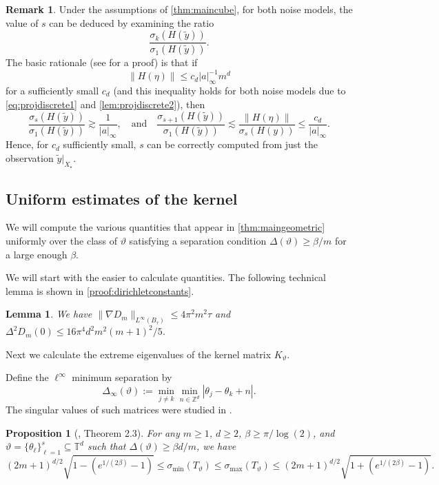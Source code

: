 \documentclass[11pt]{article}
\newtheorem{proposition}[theorem]{Proposition}
\newtheorem{lemma}[theorem]{Lemma}
\theoremstyle{definition}
\newtheorem{remark}{Remark}[section]
\numberwithin{theorem}{section}
\numberwithin{lemma}{section}
\numberwithin{equation}{section}
\def\T{\mathbb{T}}
\def\Z{\mathbb{Z}}
\renewcommand{\subset}{\subseteq}
\renewcommand{\tilde}{\widetilde}
\def\andspace{\quad\text{and}\quad}
\numberwithin{equation}{section}
\begin{document}
    \begin{remark}
        \label{rem:sparsitydetection}
        Under the assumptions of \cref{thm:maincube}, for both noise models, the value of $s$ can be deduced by examining the ratio 
        $$
        \frac{\sigma_k(H(\tilde y))}{\sigma_1(H(\tilde y))}. 
        $$
        The basic rationale (see \cite[Lemma 5.6]{fannjiang2025optimality} for a proof) is that if 
        $$
        \|H(\eta)\|\leq c_d |a|_\infty^{-1} m^d
        $$
        for a sufficiently small $c_d$ (and this inequality holds for both noise models due to \eqref{eq:projdiscrete1} and \cref{lem:projdiscrete2}), then 
        $$
        \frac{\sigma_s(H(\tilde y))}{\sigma_1(H(\tilde y))} \gtrsim \frac 1{|a|_\infty}, \andspace
        \frac{\sigma_{s+1}(H(\tilde y))}{\sigma_1(H(\tilde y))}
        \lesssim \frac{\|H(\eta)\|}{\sigma_s(H(y))}
        \leq \frac{c_d}{|a|_\infty}.
        $$
        Hence, for $c_d$ sufficiently small, $s$ can be correctly computed from just the observation $\tilde y|_{X_\star}$.  
    \end{remark}


	\subsection{Uniform estimates of the kernel}
	\label{sec:verification1}
	
	We will compute the various quantities that appear in \cref{thm:maingeometric} uniformly over the class of $\vartheta$ satisfying a separation condition $\Delta(\vartheta)\geq \beta/m$ for a large enough $\beta$. 
	
	We will start with the easier to calculate quantities. The following technical lemma is shown in \cref{proof:dirichletconstants}.
	 
	\begin{lemma}\label{lem:dirichletconstants} 
		We have $\|\nabla D_m\|_{L^\infty(B_\tau)} \leq 4\pi^2 m^2 \tau$ and $\Delta^2 D_m(0)\leq 16\pi^4 d^2 m^2 (m+1)^2/5$. 
	\end{lemma}
	
   Next we calculate the extreme eigenvalues of the kernel matrix $K_\vartheta$. 
	
	Define the $\ell^\infty$ minimum separation by 
	$$
	\Delta_\infty(\vartheta)
	:=\min_{j\not=k} \min_{n\in \Z^d} |\theta_j-\theta_k+n|.
	$$
	The singular values of such matrices were studied in \cite{li2025nonharmonic}. 
	\begin{proposition}[\cite{li2025nonharmonic}, Theorem 2.3]\label{prop:lifourier}
		For any $m\geq 1$, $d\geq 2$, $\beta\geq \pi/\log(2)$, and $\vartheta=\{\theta_\ell\}_{\ell=1}^s\subset \T^d$ such that $\Delta(\vartheta) \geq \beta d/m$, 
		we have 
		$$
		(2m+1)^{d/2} \sqrt{1-(e^{1/(2\beta)}-1)}
		\leq \sigma_{\min}(T_\vartheta)
		\leq \sigma_{\max}(T_\vartheta)
		\leq (2m+1)^{d/2}\sqrt{1+(e^{1/(2\beta)}-1)}.
		$$
	\end{proposition}
	
\end{document}
